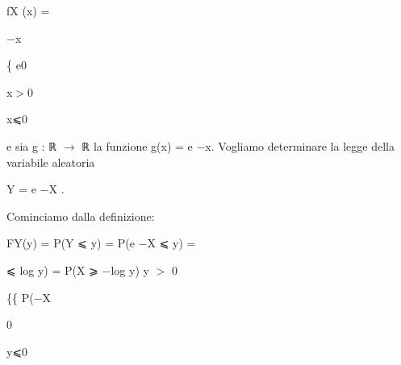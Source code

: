 \documentclass[a4paper,portrait,12pt]{article}
\begin{document}
\begin{flushleft}
fX (x) =
\end{flushleft}





\begin{flushleft}
$-$x
\end{flushleft}





\begin{flushleft}
\{ e0
\end{flushleft}





\begin{flushleft}
x$>$0
\end{flushleft}


\begin{flushleft}
x⩽0
\end{flushleft}





\begin{flushleft}
e sia g : ℝ $\rightarrow$ ℝ la funzione g(x) = e $-$x. Vogliamo determinare la legge della variabile aleatoria
\end{flushleft}


\begin{flushleft}
Y = e $-$X .
\end{flushleft}


\begin{flushleft}
Cominciamo dalla definizione:
\end{flushleft}


\begin{flushleft}
FY(y) = P(Y ⩽ y) = P(e $-$X ⩽ y) =
\end{flushleft}





\begin{flushleft}
⩽ log y) = P(X ⩾ $-$log y) y $>$ 0
\end{flushleft}


\begin{flushleft}
\{\{ P($-$X
\end{flushleft}


0


\begin{flushleft}
y⩽0
\end{flushleft}
\end{document}
